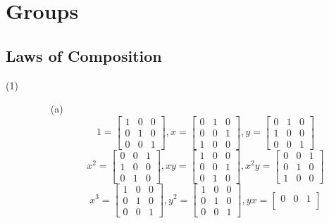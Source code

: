 \documentclass[openany]{book}
\begin{document}
\chapter{Groups}

\section{Laws of Composition}
\begin{description}
\item[(1)]
\begin{itemize}
\item[(a)]
$$1 = \begin{bmatrix}
1 & 0 & 0 \\
0 & 1 & 0 \\
0 & 0 & 1
\end{bmatrix}, x = \begin{bmatrix}
0 & 1 & 0 \\
0 & 0 & 1 \\
1 & 0 & 0
\end{bmatrix}, y = \begin{bmatrix}
0 & 1 & 0 \\
1 & 0 & 0 \\
0 & 0 & 1
\end{bmatrix}$$
$$x^2 = \begin{bmatrix}
0 & 0 & 1 \\
1 & 0 & 0 \\
0 & 1 & 0
\end{bmatrix}, xy = \begin{bmatrix}
1 & 0 & 0 \\
0 & 0 & 1 \\
0 & 1 & 0
\end{bmatrix}, x^2y = \begin{bmatrix}
0 & 0 & 1 \\
0 & 1 & 0 \\
1 & 0 & 0
\end{bmatrix}$$
$$x^3 = \begin{bmatrix}
1 & 0 & 0 \\
0 & 1 & 0 \\
0 & 0 & 1
\end{bmatrix}, y^2 = \begin{bmatrix}
1 & 0 & 0 \\
0 & 1 & 0 \\
0 & 0 & 1
\end{bmatrix}, yx = \begin{bmatrix}
0 & 0 & 1 \\

\end{bmatrix}$$
\end{itemize}
\end{description}
\end{document}
